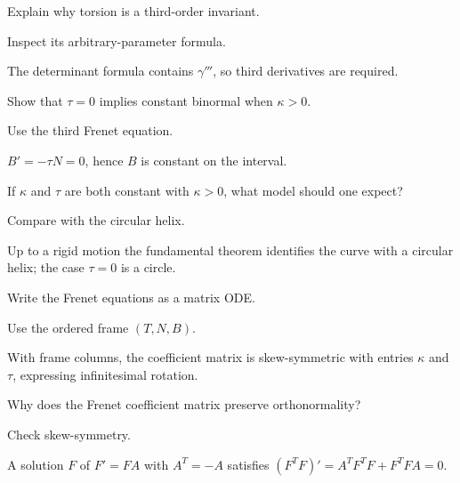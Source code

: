 \begin{exercise}\label{exr:vii13-18}
Explain why torsion is a third-order invariant.
\end{exercise}
\begin{hint}
Inspect its arbitrary-parameter formula.
\end{hint}
\begin{solution}
The determinant formula contains \(\gamma'''\), so third derivatives are required.
\end{solution}

\begin{exercise}\label{exr:vii13-19}
Show that \(\tau=0\) implies constant binormal when \(\kappa>0\).
\end{exercise}
\begin{hint}
Use the third Frenet equation.
\end{hint}
\begin{solution}
\(B'=-\tau N=0\), hence \(B\) is constant on the interval.
\end{solution}

\begin{exercise}\label{exr:vii13-20}
If \(\kappa\) and \(\tau\) are both constant with \(\kappa>0\), what model should one expect?
\end{exercise}
\begin{hint}
Compare with the circular helix.
\end{hint}
\begin{solution}
Up to a rigid motion the fundamental theorem identifies the curve with a circular helix; the case \(\tau=0\) is a circle.
\end{solution}

\begin{exercise}\label{exr:vii13-21}
Write the Frenet equations as a matrix ODE.
\end{exercise}
\begin{hint}
Use the ordered frame \((T,N,B)\).
\end{hint}
\begin{solution}
With frame columns, the coefficient matrix is skew-symmetric with entries \(\kappa\) and \(\tau\), expressing infinitesimal rotation.
\end{solution}

\begin{exercise}\label{exr:vii13-22}
Why does the Frenet coefficient matrix preserve orthonormality?
\end{exercise}
\begin{hint}
Check skew-symmetry.
\end{hint}
\begin{solution}
A solution \(F\) of \(F'=FA\) with \(A^T=-A\) satisfies \((F^TF)'=A^TF^TF+F^TFA=0\).
\end{solution}

